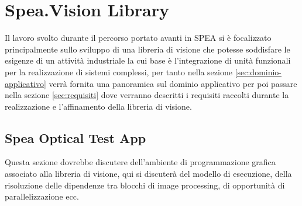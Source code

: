 \chapter{Spea.Vision Library}
Il lavoro svolto durante il percorso portato avanti in SPEA si è focalizzato
principalmente sullo sviluppo di una libreria di visione che potesse
soddisfare le esigenze di un attività industriale la cui base è l'integrazione
di unità funzionali per la realizzazione di sistemi complessi, per tanto nella sezione \ref{sec:dominio-applicativo} verrà fornita una panoramica sul dominio applicativo per poi passare nella sezione \ref{sec:requisiti} dove verranno 
descritti i requisiti raccolti durante la realizzazione e l'affinamento della libreria di visione.











\section{Spea Optical Test App}
Questa sezione dovrebbe discutere dell'ambiente di programmazione
grafica associato alla libreria di visione, qui si discuterà del
modello di esecuzione, della risoluzione delle dipendenze tra blocchi
di image processing, di opportunità di parallelizzazione ecc.

\endinput